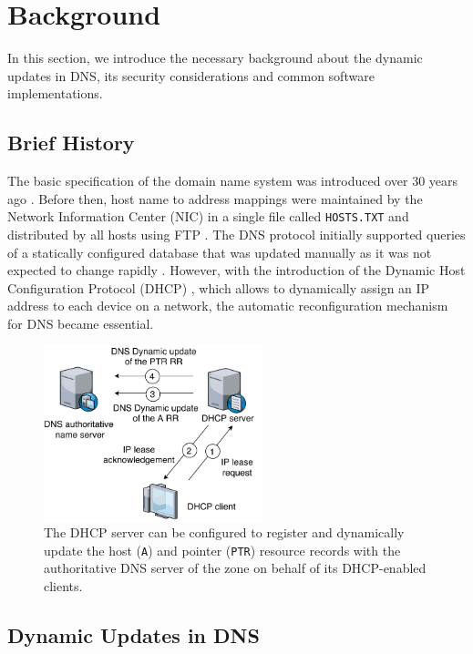 \section{Background}


In this section, we introduce the necessary background about the dynamic updates in DNS, its security considerations and common software implementations.

\subsection{Brief History}

The basic specification of the domain name system was introduced over 30 years ago \cite{rfc1035,rfc1034}. 
Before then, host name to address mappings were maintained by the Network Information Center (NIC) in a single file called \texttt{HOSTS.TXT} and distributed by all hosts using FTP \cite{rfc952,rfc953}.
%
The DNS protocol initially supported queries of a statically configured database that was updated manually as it was not expected to change rapidly \cite{rfc1034}. 
However, with the introduction of the Dynamic Host Configuration Protocol (DHCP) \cite{rfc2131}, which allows to dynamically assign an IP address to each device on a network, the automatic reconfiguration mechanism for DNS  became essential.

\begin{figure}[!ht]
\centering
\includegraphics[width=2.5in]{figs/dhcp.pdf}
\caption{The DHCP server can be configured to register and dynamically update the host (\texttt{A}) and pointer (\texttt{PTR}) resource records with the authoritative DNS server of the zone on behalf of its DHCP-enabled clients.
}
\label{fig_dhcp}
\end{figure}

\subsection{Dynamic Updates in DNS}

